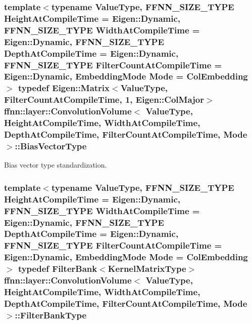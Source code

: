 \hypertarget{classffnn_1_1layer_1_1_convolution_volume_ac2655aee05415e5ffc76cf7b0ba64e61}{
\subsubsection[{Bias\-Vector\-Type}]{\setlength{\rightskip}{0pt plus 5cm}template$<$typename Value\-Type, F\-F\-N\-N\-\_\-\-S\-I\-Z\-E\-\_\-\-T\-Y\-P\-E Height\-At\-Compile\-Time = Eigen\-::\-Dynamic, F\-F\-N\-N\-\_\-\-S\-I\-Z\-E\-\_\-\-T\-Y\-P\-E Width\-At\-Compile\-Time = Eigen\-::\-Dynamic, F\-F\-N\-N\-\_\-\-S\-I\-Z\-E\-\_\-\-T\-Y\-P\-E Depth\-At\-Compile\-Time = Eigen\-::\-Dynamic, F\-F\-N\-N\-\_\-\-S\-I\-Z\-E\-\_\-\-T\-Y\-P\-E Filter\-Count\-At\-Compile\-Time = Eigen\-::\-Dynamic, Embedding\-Mode Mode = Col\-Embedding$>$ typedef Eigen\-::\-Matrix$<$Value\-Type, Filter\-Count\-At\-Compile\-Time, 1, Eigen\-::\-Col\-Major$>$ {\bf ffnn\-::layer\-::\-Convolution\-Volume}$<$ Value\-Type, Height\-At\-Compile\-Time, Width\-At\-Compile\-Time, Depth\-At\-Compile\-Time, Filter\-Count\-At\-Compile\-Time, Mode $>$\-::{\bf Bias\-Vector\-Type}}}\label{classffnn_1_1layer_1_1_convolution_volume_ac2655aee05415e5ffc76cf7b0ba64e61}


Bias vector type standardization. 

\hypertarget{classffnn_1_1layer_1_1_convolution_volume_a73cb805b7ffa2bc96461412e1cf958f9}{
\subsubsection[{Filter\-Bank\-Type}]{\setlength{\rightskip}{0pt plus 5cm}template$<$typename Value\-Type, F\-F\-N\-N\-\_\-\-S\-I\-Z\-E\-\_\-\-T\-Y\-P\-E Height\-At\-Compile\-Time = Eigen\-::\-Dynamic, F\-F\-N\-N\-\_\-\-S\-I\-Z\-E\-\_\-\-T\-Y\-P\-E Width\-At\-Compile\-Time = Eigen\-::\-Dynamic, F\-F\-N\-N\-\_\-\-S\-I\-Z\-E\-\_\-\-T\-Y\-P\-E Depth\-At\-Compile\-Time = Eigen\-::\-Dynamic, F\-F\-N\-N\-\_\-\-S\-I\-Z\-E\-\_\-\-T\-Y\-P\-E Filter\-Count\-At\-Compile\-Time = Eigen\-::\-Dynamic, Embedding\-Mode Mode = Col\-Embedding$>$ typedef {\bf Filter\-Bank}$<${\bf Kernel\-Matrix\-Type}$>$ {\bf ffnn\-::layer\-::\-Convolution\-Volume}$<$ Value\-Type, Height\-At\-Compile\-Time, Width\-At\-Compile\-Time, Depth\-At\-Compile\-Time, Filter\-Count\-At\-Compile\-Time, Mode $>$\-::{\bf Filter\-Bank\-Type}}}\label{classffnn_1_1layer_1_1_convolution_volume_a73cb805b7ffa2bc96461412e1cf958f9}


